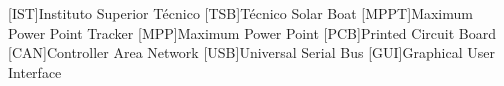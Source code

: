 



\begin{acronym}[H.264/mppt]

    [IST]{Instituto Superior T\'ecnico}
    [TSB]{Técnico Solar Boat}
    [MPPT]{Maximum Power Point Tracker}
    [MPP]{Maximum Power Point}
    [PCB]{Printed Circuit Board}
    [CAN]{Controller Area Network}
    [USB]{Universal Serial Bus}
    [GUI]{Graphical User Interface}

\end{acronym}






